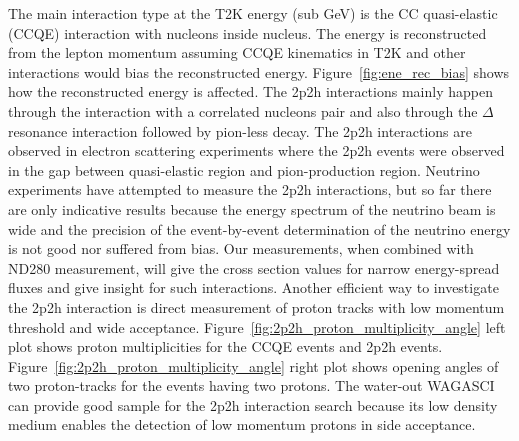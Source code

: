 The main interaction type at the T2K energy (sub GeV) is the CC quasi-elastic (CCQE) interaction with nucleons inside nucleus.
The energy is reconstructed from the lepton momentum assuming CCQE kinematics in T2K and other interactions would bias the reconstructed energy.
Figure~\ref{fig:ene_rec_bias} shows how the reconstructed energy is affected.
The 2p2h interactions mainly happen through the interaction with a correlated nucleons pair and also through the $\Delta$ resonance interaction
followed by pion-less decay.
The 2p2h interactions are observed in electron scattering experiments \cite{escattering} where the 2p2h events were observed in the gap between quasi-elastic region and pion-production region.%
Neutrino experiments have attempted to measure the 2p2h interactions, but so far there are only indicative results because the energy spectrum of the neutrino beam is wide and the precision of the event-by-event determination of the neutrino energy is not good nor suffered from bias.
Our measurements, when combined with ND280 measurement, will give the cross section values for narrow energy-spread fluxes
and give insight for such interactions. 
Another efficient way to investigate the 2p2h interaction is direct measurement of proton tracks with low momentum threshold and wide acceptance.
Figure~\ref{fig:2p2h_proton_multiplicity_angle} left plot shows proton multiplicities for the CCQE events and 2p2h events.
Figure~\ref{fig:2p2h_proton_multiplicity_angle} right plot shows opening angles of two proton-tracks for the events having two protons.
The water-out WAGASCI can provide good sample for the 2p2h interaction search because its low density medium enables the detection of low momentum protons in side acceptance.
%
